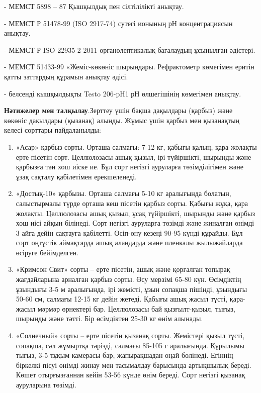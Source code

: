 - МЕМСТ 5898 -- 87 Қышқылдық пен сілтілілікті анықтау.

- МЕМСТ Р 51478-99 (ISO 2917-74) сутегі ионының рН концентрациясын
анықтау.

- МЕМСТ Р ISO 22935-2-2011 органолептикалық бағалаудың ұсынылған
әдістері.

- МЕМСТ 51433-99 «Жеміс-көкөніс шырындары. Рефрактометр көмегімен еритін
қатты заттардың құрамын анықтау әдісі.

- белсенді қышқылдықты Testo 206-pH1 рН өлшегішінің көмегімен анықтау.

{\bfseries Нәтижелер мен талқылау}.Зерттеу үшін бақша дақылдары (қарбыз)
және көкөніс дақылдары (қызанақ) алынды. Жұмыс үшін қарбыз мен
қызанақтың келесі сорттары пайдаланылды:

\begin{enumerate}
\def\labelenumi{\arabic{enumi}.}
\item
  «Асар» қарбыз сорты. Орташа салмағы: 7-12 кг, қабығы қалың, қара
  жолақты ерте пісетін сорт. Целлюлозасы ашық қызыл, ірі түйіршікті,
  шырынды және қарбызға тән хош иіске ие. Бұл сорт негізгі ауруларға
  төзімділігімен және ұзақ сақталу қабілетімен ерекшеленеді.
\item
  «Достық-10» қарбызы. Орташа салмағы 5-10 кг аралығында болатын,
  салыстырмалы түрде орташа кеш пісетін қарбыз сорты. Қабығы жұқа, қара
  жолақты. Целлюлозасы ашық қызыл, ұсақ түйіршікті, шырынды және қарбыз
  хош иісі айқын білінеді. Сорт негізгі ауруларға төзімді және жиналған
  өнімді 3 айға дейін сақтауға қабілетті. Өсіп-өну кезеңі 90-95 күнді
  құрайды. Бұл сорт оңтүстік аймақтарда ашық алаңдарда және пленкалы
  жылыжайларда өсіруге бейімделген.
\item
  «Кримсон Свит» сорты -- ерте пісетін, ашық және қорғалған топырақ
  жағдайларына арналған қарбыз сорты. Өсу мерзімі 65-80 күн. Өсімдіктің
  ұзындығы 3-5 м аралығында, ірі жемісті, ұзын сопақша пішінді, ұзындығы
  50-60 см, салмағы 12-15 кг дейін жетеді. Қабығы ашық жасыл түсті,
  қара-жасыл мәрмәр өрнектері бар. Целлюлозасы бай қызғылт-қызыл, тығыз,
  шырынды және тәтті. Бір өсімдіктен 25-30 кг өнім алынады.
\item
  «Солнечный» сорты -- ерте пісетін қызанақ сорты. Жемістері қызыл
  түсті, сопақша, сәл жұмыртқа тәрізді, салмағы 85-105 г аралығында.
  Құрылымы тығыз, 3-5 тұқым камерасы бар, жапырақшадан оңай бөлінеді.
  Егіннің біркелкі пісуі өнімді жинау мен тасымалдау барысында
  артықшылық береді. Көшет отырғызғаннан кейін 53-56 күнде өнім береді.
  Сорт негізгі қызанақ ауруларына төзімді.

\end{enumerate}
